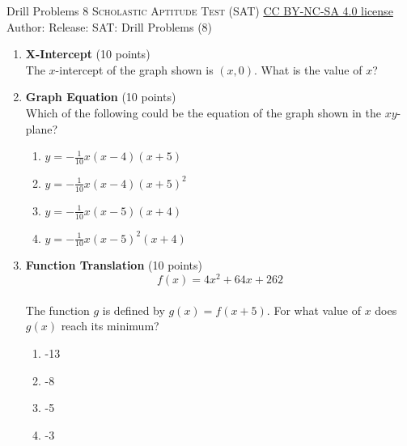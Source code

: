 \newpage\handout
{Drill Problems 8}
{\textsc{Scholastic Aptitude Test (SAT)}}
{\href{https://creativecommons.org/licenses/by-nc-sa/4.0/}{CC BY-NC-SA 4.0 license}}
{Author: \BookAuthor}{Release: \generatedOn}
{SAT: Drill Problems (8)}



\begin{enumerate}
  \item \textbf{X-Intercept} (10 points)\\
  The $x$-intercept of the graph shown is $(x, 0)$. What is the value of $x$?
  \begin{subanswer}
  \end{subanswer}
  

  \newpage


  \item \textbf{Graph Equation} (10 points)\\
  Which of the following could be the equation of the graph shown in the $xy$-plane?
  \begin{enumerate}[label=(\Alph*)]
    \item $y=-\frac{1}{10} x(x-4)(x+5)$
    \item $y=-\frac{1}{10} x(x-4)(x+5)^{2}$
    \item $y=-\frac{1}{10} x(x-5)(x+4)$
    \item $y=-\frac{1}{10} x (x-5)^{2}(x+4)$
  \end{enumerate}
  \begin{subanswer}
  \end{subanswer}


  \item \textbf{Function Translation} (10 points)\\
  $$f(x)=4 x^{2}+64 x+262$$\\
  The function $g$ is defined by $g(x)=f(x+5)$. For what value of $x$ does $g(x)$ reach its minimum?
  \begin{enumerate}[label=(\Alph*)]
    \item -13
    \item -8
    \item -5
    \item -3
  \end{enumerate}
  \begin{subanswer}
  \end{subanswer}



\end{enumerate}
